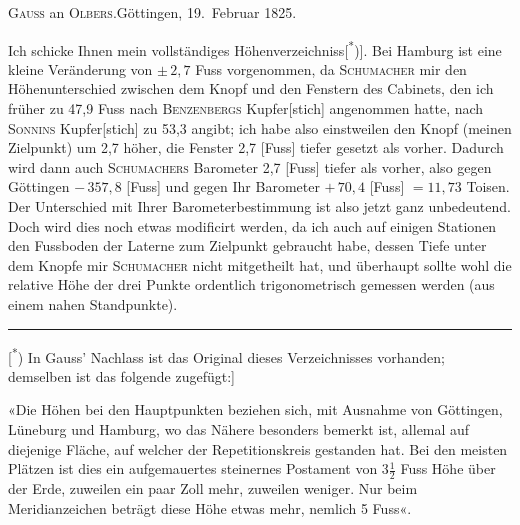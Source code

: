 \begin{center}
\textsc{Gauss} an \textsc{Olbers}.\quad Göttingen, 19.~Februar 1825.
\end{center}

\par\noindent\hspace*{\parindent}Ich schicke Ihnen mein vollständiges Höhenverzeichniss[\textsuperscript{*})].
Bei Hamburg ist eine kleine Veränderung von \(\pm\,2{,}7\) Fuss vorgenommen, da \textsc{Schumacher} mir
den Höhenunterschied zwischen dem Knopf und den Fenstern des Cabinets,
den ich früher zu 47,9 Fuss nach \textsc{Benzenbergs} Kupfer[stich] angenommen
hatte, nach \textsc{Sonnins} Kupfer[stich] zu 53,3 angibt; ich habe also einstweilen den
Knopf (meinen Zielpunkt) um 2,7 höher, die Fenster 2,7 [Fuss] tiefer gesetzt
als vorher.
Dadurch wird dann auch \textsc{Schumachers} Barometer 2,7 [Fuss] tiefer
als vorher, also gegen Göttingen \(-\,357{,}8\) [Fuss] und gegen Ihr Barometer \(+\,70{,}4\)
[Fuss] \(= 11{,}73\) Toisen.
Der Unterschied mit Ihrer Barometerbestimmung ist
also jetzt ganz unbedeutend.
Doch wird dies noch etwas modificirt werden, da
ich auch auf einigen Stationen den Fussboden der Laterne zum Zielpunkt
gebraucht habe, dessen Tiefe unter dem Knopfe mir \textsc{Schumacher} nicht mitgetheilt hat,
und überhaupt sollte wohl die relative Höhe der drei Punkte
ordentlich trigonometrisch gemessen werden (aus einem nahen Standpunkte).

\par\smallskip\noindent\rule{.24\linewidth}{.4pt}\par\smallskip
{\footnotesize
\noindent\hspace*{2.75em}[\textsuperscript{*}) In Gauss’ Nachlass ist das Original dieses Verzeichnisses vorhanden; demselben ist das folgende zugefügt:]\par
\noindent\hspace*{2.75em}«Die Höhen bei den Hauptpunkten beziehen sich, mit Ausnahme von Göttingen, Lüneburg und Hamburg,
wo das Nähere besonders bemerkt ist, allemal auf diejenige Fläche, auf welcher der Repetitionskreis gestanden hat.
Bei den meisten Plätzen ist dies ein aufgemauertes steinernes Postament von 3\(\tfrac{1}{2}\) Fuss Höhe über der Erde,
zuweilen ein paar Zoll mehr, zuweilen weniger.
Nur beim Meridianzeichen beträgt diese Höhe etwas mehr, nemlich 5 Fuss«.\par
}

